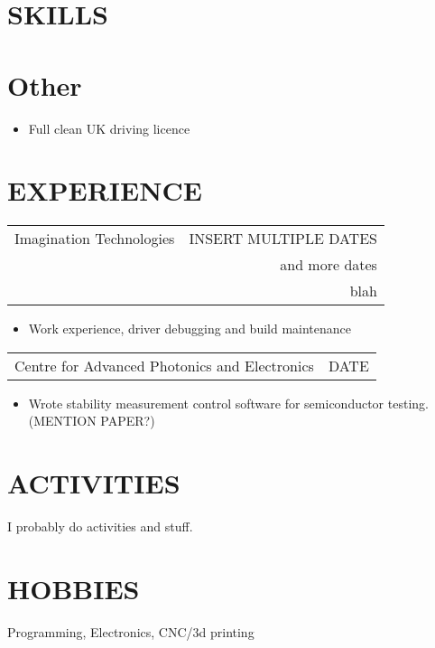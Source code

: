 \documentclass[margin]{res}
\begin{document}
\begin{resume}
\section{SKILLS} 

\normalsize{\section{Other}} 
                  \begin{itemize} \itemsep -2pt
                  \item Full clean UK driving licence 
                  \end{itemize} 
 
\section{EXPERIENCE}      
                  \begin{tabular}{p{3in} r} %
                  Imagination Technologies &  INSERT MULTIPLE DATES \\
                  & and more dates\\
                  & blah
                  \end{tabular}	
                   \begin{itemize} %
                    \item[] Work experience, driver debugging and build maintenance 
		   \end{itemize} 
		 \begin{tabular}{p{3in} r}
                  Centre for Advanced Photonics and Electronics & DATE
                 \end{tabular}	
		  \begin{itemize}
                   \item[] Wrote stability measurement control software for semiconductor testing.
					(MENTION PAPER?)
                  \end{itemize}
                
\section{ACTIVITIES}
                I probably do activities and stuff.
 
\section{HOBBIES}         Programming, Electronics, CNC/3d printing 
 
\end{resume} 
\end{document}
